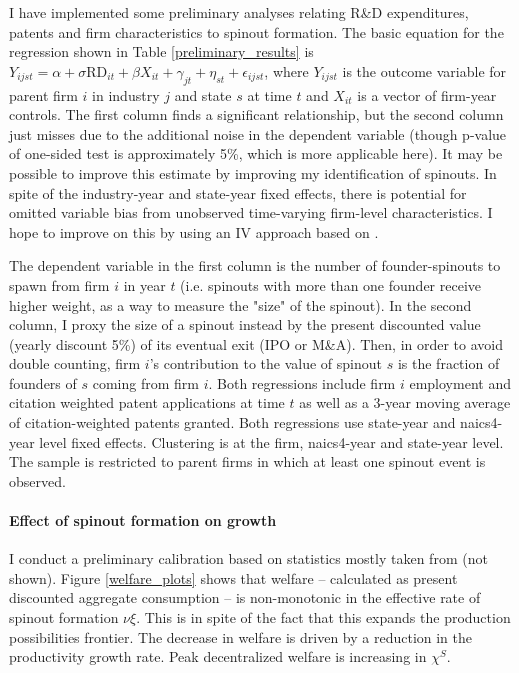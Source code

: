\documentclass[11pt,english]{article}
\theoremstyle{remark}
\begin{document}
I have implemented some preliminary analyses relating R\&D expenditures, patents and firm characteristics to spinout formation. The basic equation for the regression shown in Table \ref{preliminary_results} is $Y_{ijst} = \alpha + \sigma \textrm{RD}_{it} + \beta X_{it} + \gamma_{jt} + \eta_{st} + \epsilon_{ijst}$, where $Y_{ijst}$ is the outcome variable for parent firm $i$ in industry $j$ and state $s$ at time $t$ and $X_{it}$ is a vector of firm-year controls. The first column finds a significant relationship, but the second column just misses due to the additional noise in the dependent variable (though p-value of one-sided test is approximately 5\%, which is more applicable here). It may be possible to improve this estimate by improving my identification of spinouts. In spite of the industry-year and state-year fixed effects, there is potential for omitted variable bias from unobserved time-varying firm-level characteristics. I hope to improve on this by using an IV approach based on \cite{bloom_identifying_2013}.

\begin{table}[h] 
	\centering
	\footnotesize
	
	\footnotesize \caption{\footnotesize The dependent variable in the first column is the number of founder-spinouts to spawn from firm $i$ in year $t$ (i.e. spinouts with more than one founder receive higher weight, as a way to measure the "size" of the spinout). In the second column, I proxy the size of a spinout instead by the present discounted value (yearly discount 5\%) of its eventual exit (IPO or M\&A). Then, in order to avoid double counting, firm $i$'s contribution to the value of spinout $s$ is the fraction of founders of $s$ coming from firm $i$. Both regressions include firm $i$ employment and citation weighted patent applications at time $t$ as well as a 3-year moving average of citation-weighted patents granted. Both regressions use state-year and naics4-year level fixed effects. Clustering is at the firm, naics4-year and state-year level. The sample is restricted to parent firms in which at least one spinout event is observed.} 
	\label{preliminary_results}
\end{table}

\paragraph{Effect of spinout formation on growth}

I conduct a preliminary calibration based on statistics mostly taken from \cite{akcigit_growth_2018} (not shown). Figure \ref{welfare_plots} shows that welfare -- calculated as present discounted aggregate consumption -- is non-monotonic in the effective rate of spinout formation $\nu \xi$. This is in spite of the fact that this expands the production possibilities frontier. The decrease in welfare is driven by a reduction in the productivity growth rate. Peak decentralized welfare is increasing in $\chi^S$.
\end{document}

